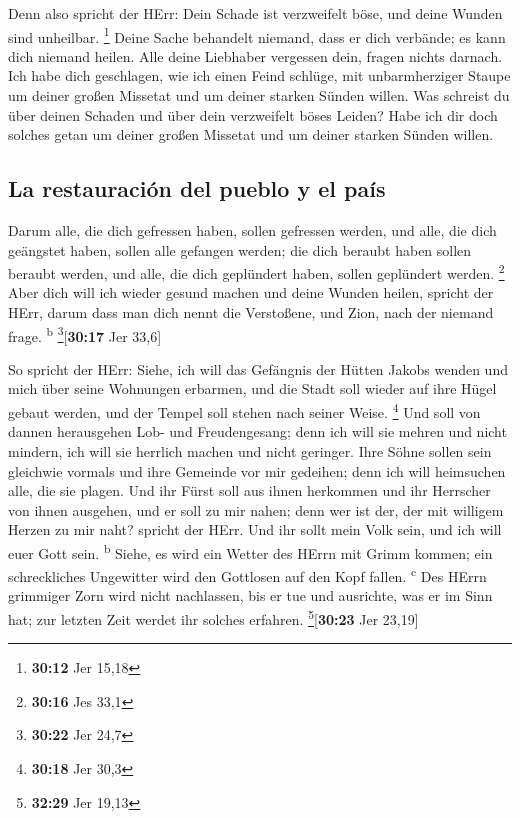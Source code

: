  Denn also spricht der HErr: Dein Schade ist verzweifelt
böse, und deine Wunden sind unheilbar. \footnote{\textbf{30:12} Jer
  15,18}  Deine Sache behandelt niemand, dass er dich
verbände; es kann dich niemand heilen.  Alle deine
Liebhaber vergessen dein, fragen nichts darnach. Ich habe dich
geschlagen, wie ich einen Feind schlüge, mit unbarmherziger Staupe um
deiner großen Missetat und um deiner starken Sünden willen.
 Was schreist du über deinen Schaden und über dein
verzweifelt böses Leiden? Habe ich dir doch solches getan um deiner
großen Missetat und um deiner starken Sünden willen.

\hypertarget{la-restauraciuxf3n-del-pueblo-y-el-pauxeds}{%
\subsection{La restauración del pueblo y el
país}\label{la-restauraciuxf3n-del-pueblo-y-el-pauxeds}}

 Darum alle, die dich gefressen haben, sollen gefressen
werden, und alle, die dich geängstet haben, sollen alle gefangen werden;
die dich beraubt haben sollen beraubt werden, und alle, die dich
geplündert haben, sollen geplündert werden. \footnote{\textbf{30:16} Jes
  33,1}  Aber dich will ich wieder gesund machen und
deine Wunden heilen, spricht der HErr, darum dass man dich nennt die
Verstoßene, und Zion, nach der niemand frage. \textsuperscript{b}
\footnote{\textbf{30:22} Jer 24,7}{[}\textbf{30:17} Jer 33,6{]}

 So spricht der HErr: Siehe, ich will das Gefängnis der
Hütten Jakobs wenden und mich über seine Wohnungen erbarmen, und die
Stadt soll wieder auf ihre Hügel gebaut werden, und der Tempel soll
stehen nach seiner Weise. \footnote{\textbf{30:18} Jer 30,3}
 Und soll von dannen herausgehen Lob- und Freudengesang;
denn ich will sie mehren und nicht mindern, ich will sie herrlich machen
und nicht geringer.  Ihre Söhne sollen sein gleichwie
vormals und ihre Gemeinde vor mir gedeihen; denn ich will heimsuchen
alle, die sie plagen.  Und ihr Fürst soll aus ihnen
herkommen und ihr Herrscher von ihnen ausgehen, und er soll zu mir
nahen; denn wer ist der, der mit willigem Herzen zu mir naht? spricht
der HErr.  Und ihr sollt mein Volk sein, und ich will
euer Gott sein. \textsuperscript{b}  Siehe, es wird ein
Wetter des HErrn mit Grimm kommen; ein schreckliches Ungewitter wird den
Gottlosen auf den Kopf fallen. \textsuperscript{c}  Des
HErrn grimmiger Zorn wird nicht nachlassen, bis er tue und ausrichte,
was er im Sinn hat; zur letzten Zeit werdet ihr solches erfahren.
\footnote{\textbf{32:29} Jer 19,13}{[}\textbf{30:23} Jer 23,19{]}

